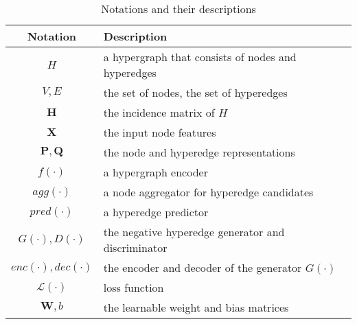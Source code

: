 \begin{table}[t]
\centering
\caption{Notations and their descriptions}
\vspace{-2mm}
\setlength\tabcolsep{1pt}
\begin{tabular}{cl}
\toprule
 \textbf{Notation} & \textbf{Description}\\
\midrule
$H$ & a hypergraph that consists of nodes and hyperedges \\
$V, E$ & the set of nodes, the set of hyperedges \\
$\mathbf{H}$ &the incidence matrix of $H$ \\
\midrule
$\mathbf{X}$ & the input node features \\
$\mathbf{P}, \mathbf{Q}$ & the node and hyperedge representations  \\
\midrule
$f(\cdot)$ & a hypergraph encoder \\
$agg(\cdot)$ & a node aggregator for hyperedge candidates \\
$pred(\cdot)$ & a hyperedge predictor \\
$G(\cdot), D(\cdot)$ & the negative hyperedge generator and discriminator \\
$enc(\cdot), dec(\cdot)$ & the encoder and decoder of the generator $G(\cdot)$ \\
\midrule
$\mathcal{L}(\cdot)$ & loss function \\
$\mathbf{W}, b$ & the learnable weight and bias matrices \\

\bottomrule
\end{tabular}
\label{table:notations}
\end{table}





